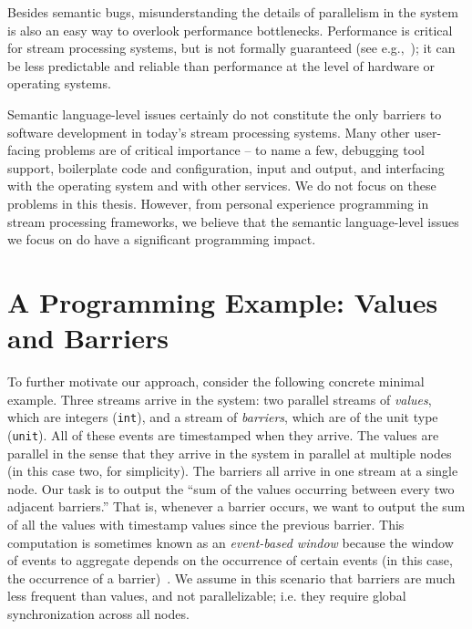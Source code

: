 Besides semantic bugs, misunderstanding the details of parallelism in the system is also an easy way to overlook performance bottlenecks. Performance is critical for stream processing systems, but is not formally guaranteed (see e.g.,~\cite{lopez2016performance,dias2018dsp-survey,hoffmann2018snailtrail,bordin2020dspbench}); it can be less predictable and reliable than performance at the level of hardware or operating systems.

Semantic language-level issues certainly do not constitute the only barriers to software development in today's stream processing systems. Many other user-facing problems are of critical importance -- to name a few, debugging tool support, boilerplate code and configuration, input and output, and interfacing with the operating system and with other services. We do not focus on these problems in this thesis. However, from personal experience programming in stream processing frameworks, we believe that the semantic language-level issues we focus on do have a significant programming impact.

\section{A Programming Example: Values and Barriers}
\label{ex:value-barrier}

To further motivate our approach, consider the following concrete minimal example.
Three streams arrive in the system: two parallel streams of \emph{values}, which are integers (\texttt{int}), and a stream of \emph{barriers}, which are of the unit type (\texttt{unit}).
All of these events are timestamped when they arrive.
The values are parallel in the sense that they arrive in the system in parallel at multiple nodes (in this case two, for simplicity).
The barriers all arrive in one stream at a single node.
Our task is to output the ``sum of the values occurring between every two adjacent barriers.'' That is, whenever a barrier occurs, we want to output the sum of all the values with timestamp values since the previous barrier. This computation is sometimes known as an \emph{event-based window} because the window of events to aggregate depends on the occurrence of certain events (in this case, the occurrence of a barrier)~\cite{EventBasedWindow}.
We assume in this scenario that barriers are much less frequent than values, and not parallelizable; i.e. they require global synchronization across all nodes.

